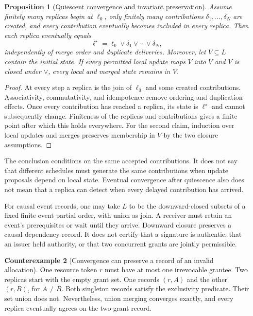 \documentclass[11pt,letterpaper]{article}
\theoremstyle{plain}
\newtheorem{proposition}{Proposition}[section]
\theoremstyle{definition}
\newtheorem{counterexample}[proposition]{Counterexample}
\theoremstyle{remark}
\begin{document}
\begin{proposition}[Quiescent convergence and invariant preservation]\label{prop:merge-convergence}
Assume finitely many replicas begin at $\ell_0$, only finitely many contributions $\delta_1,\ldots,\delta_N$ are created, and every contribution eventually becomes included in every replica. Then each replica eventually equals
\[
\ell^\star=\ell_0\vee\delta_1\vee\cdots\vee\delta_N,
\]
independently of merge order and duplicate deliveries. Moreover, let $V\subseteq L$ contain the initial state. If every permitted local update maps $V$ into $V$ and $V$ is closed under $\vee$, every local and merged state remains in $V$.
\end{proposition}
\begin{proof}
At every step a replica is the join of $\ell_0$ and some created contributions. Associativity, commutativity, and idempotence remove ordering and duplication effects. Once every contribution has reached a replica, its state is $\ell^\star$ and cannot subsequently change. Finiteness of the replicas and contributions gives a finite point after which this holds everywhere. For the second claim, induction over local updates and merges preserves membership in $V$ by the two closure assumptions.
\end{proof}

The conclusion conditions on the same accepted contributions. It does not say that different schedules must generate the same contributions when update proposals depend on local state. Eventual convergence after quiescence also does not mean that a replica can detect when every delayed contribution has arrived.

For causal event records, one may take $L$ to be the downward-closed subsets of a fixed finite event partial order, with union as join. A receiver must retain an event's prerequisites or wait until they arrive. Downward closure preserves a causal dependency record. It does not certify that a signature is authentic, that an issuer held authority, or that two concurrent grants are jointly permissible.

\begin{counterexample}[Convergence can preserve a record of an invalid allocation]\label{ex:convergent-double-grant}
One resource token $r$ must have at most one irrevocable grantee. Two replicas start with the empty grant set. One records $(r,A)$ and the other $(r,B)$, for $A\ne B$. Both singleton records satisfy the exclusivity predicate. Their set union does not. Nevertheless, union merging converges exactly, and every replica eventually agrees on the two-grant record.
\end{counterexample}
\end{document}
